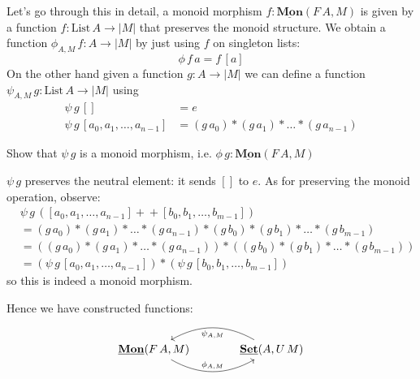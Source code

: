 \documentclass{article}
\newcommand{\Set}{\mathbf{Set}}
\newcommand{\cat}[1]{\underline{\mathbf{#1}}}
\newcommand{\obj}[1]{|#1|}
\newcommand{\List}{\mathrm{List}}
\newcommand{\app}{+\!\!+}
\begin{document}
Let's go through this in detail, a monoid morphism $f:\cat{Mon}(F\,A,M)$ is given by a function $f:\List\,A \to |M|$ that preserves the monoid structure. We obtain a function $\phi_{A,M}\,f : A \to |M|$ by just using $f$ on singleton lists: 
\[\phi\,f\,a = f\,[a]\] 
On the other hand given a function $g : A \to |M|$ we can define a function $\psi_{A,M}\,g : \List\,A \to |M|$ using
\begin{align*}
  \psi\,g\,[] & = e \\
  \psi\,g\, [a_0,a_1,\dots,a_{n-1}] & = (g\,a_0) * (g\,a_1) * \dots * (g\,a_{n-1})
\end{align*}
\begin{Exercise}
  Show that $\psi\,g$ is a monoid morphism, i.e. $\phi\,g : \cat{Mon}(F\,A,M)$
\end{Exercise}
\begin{Answer}
  $\psi\,g$ preserves the neutral element: it sends $[]$ to $e$. As for preserving the monoid operation, observe:
  \begin{align*}
      &\psi\,g\,([a_0,a_1,\dots,a_{n-1}]\app[b_0,b_1,\dots,b_{m-1}])\\
        &= (g\,a_0) * (g\,a_1) * \dots * (g\,a_{n-1}) * (g\,b_0) * (g\,b_1) * \dots * (g\,b_{m-1})\\
        &= ((g\,a_0) * (g\,a_1) * \dots * (g\,a_{n-1})) * ((g\,b_0) * (g\,b_1) * \dots * (g\,b_{m-1}))\\
        &= (\psi\,g\,[a_0,a_1,\dots,a_{n-1}]) * (\psi\,g\,[b_0,b_1,\dots,b_{m-1}])
  \end{align*}
  so this is indeed a monoid morphism.
\end{Answer}
Hence we have constructed functions:
\[\begin{tikzcd}[column sep = large]
\cat{Mon}(F\,A,M) \arrow[r,"\phi_{A,M}",bend right] & \cat{\Set}(A,U\,M) \arrow[l,"\psi_{A,M}",bend right]
\end{tikzcd}\]
\end{document}
